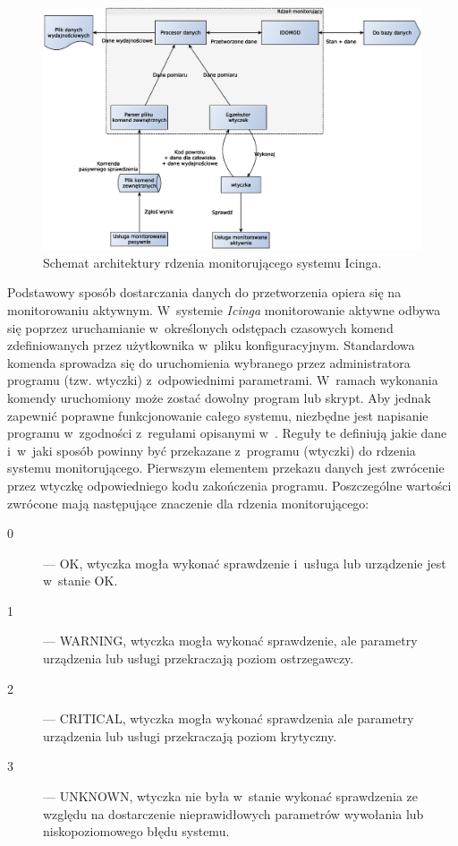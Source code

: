 \begin{figure}[ht]
  \caption{Schemat architektury rdzenia monitorującego systemu
    Icinga.}
  \label{fig:icingaCoreArch}
\includegraphics[width=1\textwidth]{img/icingaCoreArch}
\end{figure}


Podstawowy sposób dostarczania danych do przetworzenia opiera się na
monitorowaniu aktywnym. W~systemie {\em Icinga} monitorowanie aktywne odbywa
się poprzez uruchamianie w~określonych odstępach czasowych komend
zdefiniowanych przez użytkownika w~pliku konfiguracyjnym. Standardowa
komenda sprowadza się do uruchomienia wybranego przez administratora
programu (tzw. wtyczki) z~odpowiednimi parametrami. W~ramach wykonania
komendy uruchomiony może zostać dowolny program lub skrypt. Aby jednak
zapewnić poprawne funkcjonowanie całego systemu, niezbędne jest
napisanie programu w~zgodności z~regułami opisanymi
w~\cite{www:NagiosPluginsTutorial}. Reguły te definiują jakie dane
i~w~jaki sposób powinny być przekazane z~programu (wtyczki) do rdzenia
systemu monitorującego. Pierwszym elementem przekazu danych jest
zwrócenie przez wtyczkę odpowiedniego kodu zakończenia
programu. Poszczególne wartości zwrócone mają następujące znaczenie
dla rdzenia monitorującego:

\begin{description}
\item[0] --- OK, wtyczka mogła wykonać sprawdzenie i~usługa lub urządzenie
  jest w~stanie OK.
\item[1] --- WARNING, wtyczka mogła wykonać sprawdzenie, ale parametry
  urządzenia lub usługi przekraczają poziom ostrzegawczy.
\item[2] --- CRITICAL, wtyczka mogła wykonać sprawdzenia ale parametry
  urządzenia lub usługi przekraczają poziom krytyczny.
\item[3] --- UNKNOWN, wtyczka nie była w~stanie wykonać sprawdzenia ze
  względu na dostarczenie nieprawidłowych parametrów wywołania lub
  niskopoziomowego błędu systemu.
\end{description}

